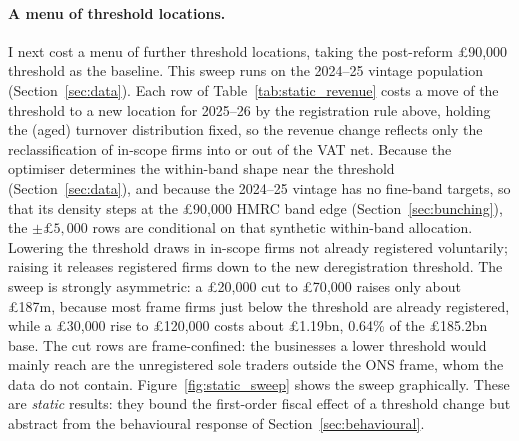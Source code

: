 \paragraph{A menu of threshold locations.} I next cost a menu of further threshold
locations, taking the post-reform \pounds90{,}000 threshold as the baseline. This
sweep runs on the 2024--25 vintage population (Section~\ref{sec:data}). Each
row of Table~\ref{tab:static_revenue} costs a move of the threshold to a new
location for 2025--26 by the registration rule above, holding the (aged)
turnover distribution fixed, so the revenue change reflects only the
reclassification of in-scope firms into or out of the VAT net. Because the
optimiser determines the within-band shape near the threshold
(Section~\ref{sec:data}), and because the 2024--25 vintage has no fine-band
targets, so that its density steps at the \pounds90{,}000 HMRC band edge
(Section~\ref{sec:bunching}), the $\pm\pounds5{,}000$ rows are conditional on
that synthetic within-band allocation. Lowering the threshold draws in
in-scope firms not already registered voluntarily; raising it releases
registered firms down to the new deregistration threshold. The sweep is
strongly asymmetric: a \pounds20{,}000 cut to \pounds70{,}000 raises only
about \pounds187m, because most frame firms just below the threshold are already
registered, while a \pounds30{,}000 rise to \pounds120{,}000 costs about
\pounds1.19bn, 0.64\% of the \pounds185.2bn base. The cut rows are
frame-confined: the businesses a lower threshold would mainly reach are the
unregistered sole traders outside the ONS frame, whom the data do not contain.
Figure~\ref{fig:static_sweep}
shows the sweep graphically. These are \emph{static} results: they bound the
first-order fiscal effect of a threshold change but abstract from the
behavioural response of Section~\ref{sec:behavioural}.


